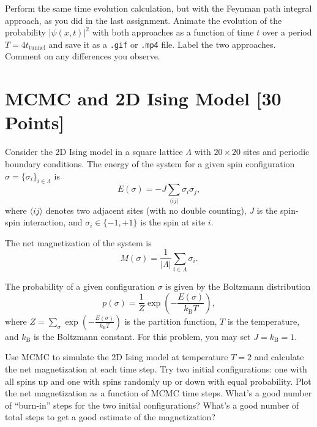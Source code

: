 \begin{solution}
\end{solution}

\begin{problem}[10]
Perform the same time evolution calculation, but with the Feynman path integral approach, as you did in the last assignment.
Animate the evolution of the probability $|\psi(x, t)|^2$ with both approaches as a function of time $t$ over a period $T = 4t_\mathrm{tunnel}$ and save it as a \texttt{.gif} or \texttt{.mp4} file.
Label the two approaches.
Comment on any differences you observe.
\end{problem}

\begin{solution}
\end{solution}


\newpage
\section{MCMC and 2D Ising Model [30 Points]}

Consider the 2D Ising model in a square lattice $\Lambda$ with $20\times 20$ sites and periodic boundary conditions.
The energy of the system for a given spin configuration $\sigma = \{\sigma_i\}_{i\in \Lambda}$ is
\begin{equation}
  E(\sigma) = -J\sum_{\langle ij\rangle} \sigma_i\sigma_j,
\end{equation}
where $\langle i j \rangle$ denotes two adjacent sites (with no double counting), $J$ is the spin-spin interaction, and $\sigma_i \in \{ -1, +1\}$ is the spin at site $i$.

The net magnetization of the system is
\begin{equation}
  M(\sigma) = \frac{1}{|\Lambda|}\sum_{i\in \Lambda} \sigma_i.
\end{equation}

The probability of a given configuration $\sigma$ is given by the Boltzmann distribution
\begin{equation}
  p(\sigma) = \frac{1}{Z}\exp \left(-\frac{E(\sigma)}{k_\mathrm{B}T}\right),
\end{equation}
where $Z = \sum_{\sigma} \exp \left(-\frac{E(\sigma)}{k_\mathrm{B}T}\right)$ is the partition function, $T$ is the temperature, and $k_\mathrm{B}$ is the Boltzmann constant.
For this problem, you may set $J=k_\mathrm{B}=1$.

\begin{problem}[10]
Use MCMC to simulate the 2D Ising model at temperature $T=2$ and calculate the net magnetization at each time step.
Try two initial configurations: one with all spins up and one with spins randomly up or down with equal probability.
Plot the net magnetization as a function of MCMC time steps.
What's a good number of ``burn-in'' steps for the two initial configurations?
What's a good number of total steps to get a good estimate of the magnetization?
\end{problem}


